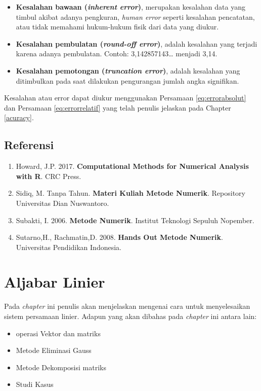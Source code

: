 \documentclass[]{book}
\providecommand{\tightlist}{%
  \setlength{\itemsep}{0pt}\setlength{\parskip}{0pt}}
\theoremstyle{definition}
\theoremstyle{definition}
\theoremstyle{definition}
\theoremstyle{remark}
\begin{document}
\begin{itemize}
\item
  \textbf{Kesalahan bawaan (\emph{inherent error})}, merupakan kesalahan data yang timbul akibat adanya pengkuran, \emph{human error} seperti kesalahan pencatatan, atau tidak memahami hukum-hukum fisik dari data yang diukur.
\item
  \textbf{Kesalahan pembulatan (\emph{round-off error})}, adalah kesalahan yang terjadi karena adanya pembulatan. Contoh: 3,142857143\ldots{} menjadi 3,14.
\item
  \textbf{Kesalahan pemotongan (\emph{truncation error})}, adalah kesalahan yang ditimbulkan pada saat dilakukan pengurangan jumlah angka signifikan.
\end{itemize}

Kesalahan atau error dapat diukur menggunakan Persamaan \eqref{eq:errorabsolut} dan Persamaan \eqref{eq:errorrelatif} yang telah penulis jelaskan pada Chapter \ref{acuracy}.

\hypertarget{referensi-4}{%
\section{Referensi}\label{referensi-4}}

\begin{enumerate}
\def\labelenumi{\arabic{enumi}.}
\tightlist
\item
  Howard, J.P. 2017. \textbf{Computational Methods for Numerical Analysis with R}. CRC Press.
\item
  Sidiq, M. Tanpa Tahun. \textbf{Materi Kuliah Metode Numerik}. Repository Universitas Dian Nuswantoro.
\item
  Subakti, I. 2006. \textbf{Metode Numerik}. Institut Teknologi Sepuluh Nopember.
\item
  Sutarno,H., Rachmatin,D. 2008. \textbf{Hands Out Metode Numerik}. Universitas Pendidikan Indonesia.
\end{enumerate}

\hypertarget{linearaljabar}{%
\chapter{Aljabar Linier}\label{linearaljabar}}

Pada \emph{chapter} ini penulis akan menjelaskan mengenai cara untuk menyelesaikan sistem persamaan linier. Adapun yang akan dibahas pada \emph{chapter} ini antara lain:

\begin{itemize}
\tightlist
\item
  operasi Vektor dan matriks
\item
  Metode Eliminasi Gauss
\item
  Metode Dekomposisi matriks
\item
  Studi Kasus
\end{itemize}
\end{document}
